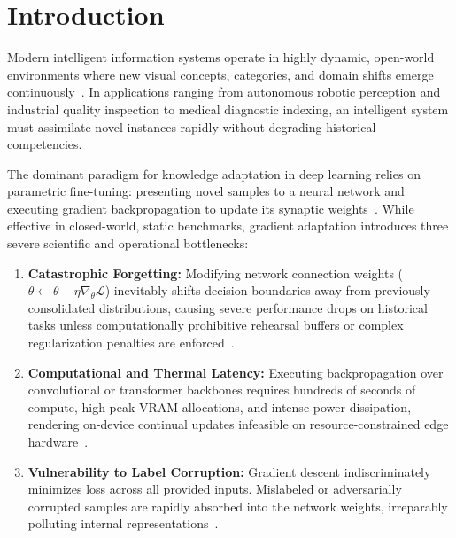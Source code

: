 \documentclass[sn-mathphys,Numbered]{sn-jnl}
\begin{document}

\maketitle

\section{Introduction}\label{sec:intro}

Modern intelligent information systems operate in highly dynamic, open-world environments where new visual concepts, categories, and domain shifts emerge continuously~\cite{parisi2019continual}. In applications ranging from autonomous robotic perception and industrial quality inspection to medical diagnostic indexing, an intelligent system must assimilate novel instances rapidly without degrading historical competencies.

The dominant paradigm for knowledge adaptation in deep learning relies on parametric fine-tuning: presenting novel samples to a neural network and executing gradient backpropagation to update its synaptic weights~\cite{he2016deep,tan2019efficientnet,dosovitskiy2020image}. While effective in closed-world, static benchmarks, gradient adaptation introduces three severe scientific and operational bottlenecks:
\begin{enumerate}
    \item \textbf{Catastrophic Forgetting:} Modifying network connection weights ($\theta \leftarrow \theta - \eta \nabla_\theta \mathcal{L}$) inevitably shifts decision boundaries away from previously consolidated distributions, causing severe performance drops on historical tasks unless computationally prohibitive rehearsal buffers or complex regularization penalties are enforced~\cite{kirkpatrick2017overcoming,rebuffi2017icarl}.
    \item \textbf{Computational and Thermal Latency:} Executing backpropagation over convolutional or transformer backbones requires hundreds of seconds of compute, high peak VRAM allocations, and intense power dissipation, rendering on-device continual updates infeasible on resource-constrained edge hardware~\cite{howard2019searching}.
    \item \textbf{Vulnerability to Label Corruption:} Gradient descent indiscriminately minimizes loss across all provided inputs. Mislabeled or adversarially corrupted samples are rapidly absorbed into the network weights, irreparably polluting internal representations~\cite{han2018co,patrini2017making}.
\end{enumerate}
\end{document}
